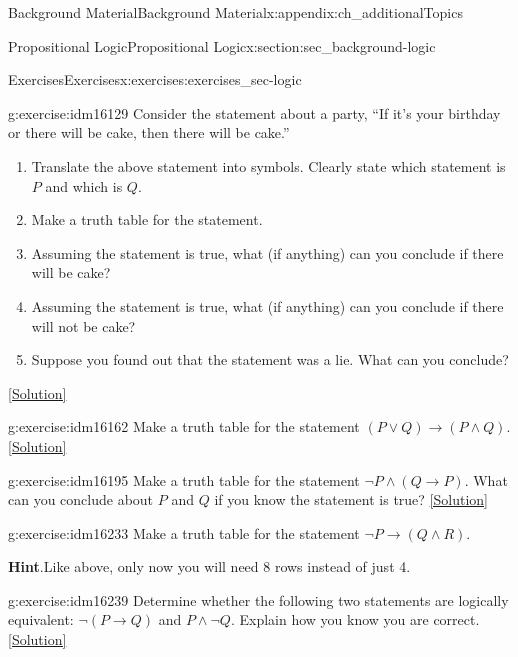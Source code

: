 \documentclass[oneside,10pt,]{book}
\numberwithin{equation}{chapter}
\def\imp{\rightarrow}
\begin{document}
\begin{appendixptx}{Background Material}{}{Background Material}{}{}{x:appendix:ch_additionalTopics}
\begin{sectionptx}{Propositional Logic}{}{Propositional Logic}{}{}{x:section:sec_background-logic}
\begin{exercises-subsection}{Exercises}{}{Exercises}{}{}{x:exercises:exercises_sec-logic}
\begin{divisionexercise}{1}{}{}{g:exercise:idm16129}
Consider the statement about a party, ``If it's your birthday or there will be cake, then there will be cake.''%
\par
%
\begin{enumerate}[label=(\alph*)]
\item{}Translate the above statement into symbols. Clearly state which statement is \(P\) and which is \(Q\).%
\item{}Make a truth table for the statement.%
\item{}Assuming the statement is true, what (if anything) can you conclude if there will be cake?%
\item{}Assuming the statement is true, what (if anything) can you conclude if there will not be cake?%
\item{}Suppose you found out that the statement was a lie. What can you conclude?%
\end{enumerate}
%
\space\hspace*{0pt}\hfill{\tiny\hyperlink{g:solution:idm16147-main}{[Solution]}}\end{divisionexercise}%
\begin{divisionexercise}{2}{}{}{g:exercise:idm16162}%
Make a truth table for the statement \((P \vee Q) \imp (P \wedge Q)\).%
\space\hspace*{0pt}\hfill{\tiny\hyperlink{g:solution:idm16166-main}{[Solution]}}\end{divisionexercise}%
\begin{divisionexercise}{3}{}{}{g:exercise:idm16195}%
Make a truth table for the statement \(\neg P \wedge (Q \imp P)\). What can you conclude about \(P\) and \(Q\) if you know the statement is true?%
\space\hspace*{0pt}\hfill{\tiny\hyperlink{g:solution:idm16201-main}{[Solution]}}\end{divisionexercise}%
\begin{divisionexercise}{4}{}{}{g:exercise:idm16233}%
Make a truth table for the statement \(\neg P \imp (Q \wedge R)\).%
\par\smallskip%
\noindent\textbf{Hint}.\hypertarget{g:hint:idm16237}{}\quad{}Like above, only now you will need 8 rows instead of just 4.%
\end{divisionexercise}%
\begin{divisionexercise}{5}{}{}{g:exercise:idm16239}%
Determine whether the following two statements are logically equivalent:  \(\neg(P \imp Q)\) and \(P \wedge \neg Q\). Explain how you know you are correct.%
\space\hspace*{0pt}\hfill{\tiny\hyperlink{g:solution:idm16244-main}{[Solution]}}\end{divisionexercise}%

\end{exercises-subsection}
\end{sectionptx}
\end{appendixptx}
\end{document}
